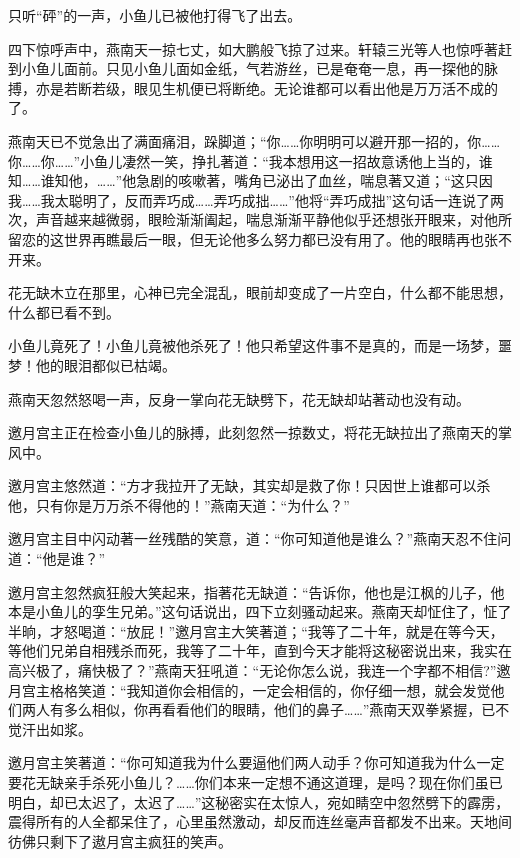 \documentclass[12pt,oneside]{book}
\begin{document}
只听``砰''的一声，小鱼儿已被他打得飞了出去。

四下惊呼声中，燕南天一掠七丈，如大鹏般飞掠了过来。轩辕三光等人也惊呼著赶到小鱼儿面前。只见小鱼儿面如金纸，气若游丝，已是奄奄一息，再一探他的脉搏，亦是若断若级，眼见生机便已将断绝。无论谁都可以看出他是万万活不成的了。

燕南天已不觉急出了满面痛泪，跺脚道；``你\ldots\ldots 你明明可以避开那一招的，你\ldots\ldots 你\ldots\ldots 你\ldots\ldots{}''小鱼儿凄然一笑，挣扎著道：``我本想用这一招故意诱他上当的，谁知\ldots\ldots 谁知他，\ldots\ldots{}''他急剧的咳嗽著，嘴角已泌出了血丝，喘息著又道；``这只因我\ldots\ldots 我太聪明了，反而弄巧成\ldots\ldots 弄巧成拙\ldots\ldots{}''他将``弄巧成拙''这句话一连说了两次，声音越来越微弱，眼睑渐渐阖起，喘息渐渐平静他似乎还想张开眼来，对他所留恋的这世界再瞧最后一眼，但无论他多么努力都已没有用了。他的眼睛再也张不开来。

花无缺木立在那里，心神已完全混乱，眼前却变成了一片空白，什么都不能思想，什么都已看不到。

小鱼儿竟死了！小鱼儿竟被他杀死了！他只希望这件事不是真的，而是一场梦，噩梦！他的眼泪都似已枯竭。

燕南天忽然怒喝一声，反身一掌向花无缺劈下，花无缺却站著动也没有动。

邀月宫主正在检查小鱼儿的脉搏，此刻忽然一掠数丈，将花无缺拉出了燕南天的掌风中。

邀月宫主悠然道：``方才我拉开了无缺，其实却是救了你！只因世上谁都可以杀他，只有你是万万杀不得他的！''燕南天道：``为什么？''

邀月宫主目中闪动著一丝残酷的笑意，道：``你可知道他是谁么？''燕南天忍不住问道：``他是谁？''

邀月宫主忽然疯狂般大笑起来，指著花无缺道：``告诉你，他也是江枫的儿子，他本是小鱼儿的孪生兄弟。''这句话说出，四下立刻骚动起来。燕南天却怔住了，怔了半晌，才怒喝道：``放屁！''邀月宫主大笑著道；``我等了二十年，就是在等今天，等他们兄弟自相残杀而死，我等了二十年，直到今天才能将这秘密说出来，我实在高兴极了，痛快极了？''燕南天狂吼道：``无论你怎么说，我连一个字都不相信?''邀月宫主格格笑道：``我知道你会相信的，一定会相信的，你仔细一想，就会发觉他们两人有多么相似，你再看看他们的眼睛，他们的鼻子\ldots\ldots{}''燕南天双拳紧握，已不觉汗出如浆。

邀月宫主笑著道：``你可知道我为什么要逼他们两人动手？你可知道我为什么一定要花无缺亲手杀死小鱼儿？\ldots\ldots 你们本来一定想不通这道理，是吗？现在你们虽已明白，却已太迟了，太迟了\ldots\ldots{}''这秘密实在太惊人，宛如睛空中忽然劈下的霹雳，震得所有的人全都呆住了，心里虽然激动，却反而连丝毫声音都发不出来。天地间彷佛只剩下了遨月宫主疯狂的笑声。
\end{document}
